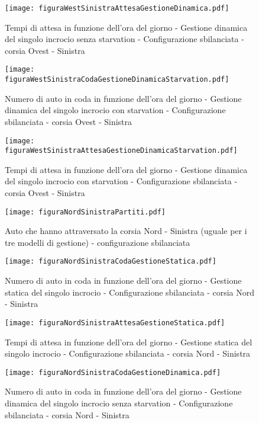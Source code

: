 \begin{figure}[H]
\centering
  \texttt{[image: figuraWestSinistraAttesaGestioneDinamica.pdf]}
  \caption{Tempi di attesa in funzione dell'ora del giorno - Gestione dinamica del singolo incrocio senza starvation - Configurazione sbilanciata - corsia Ovest - Sinistra}
  \label{fig:}
\end{figure}
\begin{figure}[H]
\centering
  \texttt{[image: figuraWestSinistraCodaGestioneDinamicaStarvation.pdf]}
  \caption{Numero di auto in coda in funzione dell'ora del giorno - Gestione dinamica del singolo incrocio con starvation - Configurazione sbilanciata - corsia Ovest - Sinistra}
  \label{fig:}
\end{figure}
\newpage
\begin{figure}[H]
\centering
  \texttt{[image: figuraWestSinistraAttesaGestioneDinamicaStarvation.pdf]}
  \caption{Tempi di attesa in funzione dell'ora del giorno - Gestione dinamica del singolo incrocio con starvation - Configurazione sbilanciata - corsia Ovest - Sinistra}
  \label{fig:}
\end{figure}

\newpage
\begin{figure}[H]
\centering
  \texttt{[image: figuraNordSinistraPartiti.pdf]}
  \caption{Auto che hanno attraversato la corsia Nord - Sinistra (uguale per i tre modelli di gestione) - configurazione sbilanciata}
  \label{fig:partitiMuSbil}
\end{figure}
\begin{figure}[H]
\centering
  \texttt{[image: figuraNordSinistraCodaGestioneStatica.pdf]}
  \caption{Numero di auto in coda in funzione dell'ora del giorno - Gestione statica del singolo incrocio - Configurazione sbilanciata - corsia Nord - Sinistra}
  \label{fig:}
\end{figure}

\newpage

\begin{figure}[H]
\centering
  \texttt{[image: figuraNordSinistraAttesaGestioneStatica.pdf]}
  \caption{Tempi di attesa in funzione dell'ora del giorno - Gestione statica del singolo incrocio - Configurazione sbilanciata - corsia Nord - Sinistra}
  \label{fig:}
\end{figure}
\begin{figure}[H]
\centering
  \texttt{[image: figuraNordSinistraCodaGestioneDinamica.pdf]}
  \caption{Numero di auto in coda in funzione dell'ora del giorno - Gestione dinamica del singolo incrocio senza starvation - Configurazione sbilanciata - corsia Nord - Sinistra}
  \label{fig:}
\end{figure}

